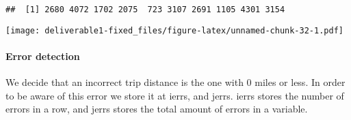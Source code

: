 \documentclass[
  18pt,
  a4paper]{article}
\newenvironment{Shaded}{\begin{snugshade}}{\end{snugshade}}
\newcommand{\CommentTok}[1]{\textcolor[rgb]{0.56,0.35,0.01}{\textit{#1}}}
\newcommand{\DataTypeTok}[1]{\textcolor[rgb]{0.13,0.29,0.53}{#1}}
\newcommand{\DecValTok}[1]{\textcolor[rgb]{0.00,0.00,0.81}{#1}}
\newcommand{\KeywordTok}[1]{\textcolor[rgb]{0.13,0.29,0.53}{\textbf{#1}}}
\newcommand{\NormalTok}[1]{#1}
\newcommand{\OperatorTok}[1]{\textcolor[rgb]{0.81,0.36,0.00}{\textbf{#1}}}
\newcommand{\StringTok}[1]{\textcolor[rgb]{0.31,0.60,0.02}{#1}}
\begin{document}
\begin{Shaded}
\end{Shaded}

\begin{verbatim}
##  [1] 2680 4072 1702 2075  723 3107 2691 1105 4301 3154
\end{verbatim}

\begin{Shaded}
\end{Shaded}

\texttt{[image: deliverable1-fixed\_files/figure-latex/unnamed-chunk-32-1.pdf]}

\begin{Shaded}
\end{Shaded}

\hypertarget{error-detection-1}{%
\paragraph{Error detection}\label{error-detection-1}}

We decide that an incorrect trip distance is the one with 0 miles or
less. In order to be aware of this error we store it at ierrs, and
jerrs. ierrs stores the number of errors in a row, and jerrs stores the
total amount of errors in a variable.
\end{document}
